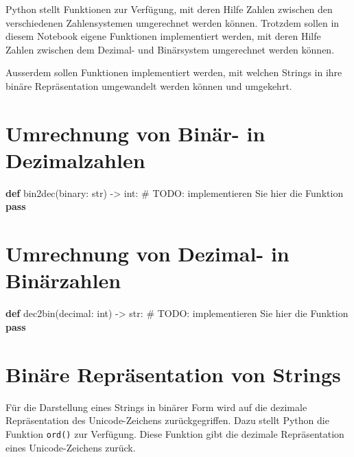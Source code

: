 \documentclass[
  nswissgerman,
  a4paper,
  DIV=11,
  numbers=noendperiod,
  ngerman]{scrreprt}
\newenvironment{Shaded}{\begin{snugshade}}{\end{snugshade}}
\newcommand{\AlertTok}[1]{\textcolor[rgb]{0.68,0.00,0.00}{#1}}
\newcommand{\BuiltInTok}[1]{\textcolor[rgb]{0.00,0.23,0.31}{#1}}
\newcommand{\CommentTok}[1]{\textcolor[rgb]{0.37,0.37,0.37}{#1}}
\newcommand{\ControlFlowTok}[1]{\textcolor[rgb]{0.00,0.23,0.31}{\textbf{#1}}}
\newcommand{\KeywordTok}[1]{\textcolor[rgb]{0.00,0.23,0.31}{\textbf{#1}}}
\newcommand{\NormalTok}[1]{\textcolor[rgb]{0.00,0.23,0.31}{#1}}
\newcommand{\OperatorTok}[1]{\textcolor[rgb]{0.37,0.37,0.37}{#1}}
\begin{document}
Python stellt Funktionen zur Verfügung, mit deren Hilfe Zahlen zwischen
den verschiedenen Zahlensystemen umgerechnet werden können. Trotzdem
sollen in diesem Notebook eigene Funktionen implementiert werden, mit
deren Hilfe Zahlen zwischen dem Dezimal- und Binärsystem umgerechnet
werden können.

Ausserdem sollen Funktionen implementiert werden, mit welchen Strings in
ihre binäre Repräsentation umgewandelt werden können und umgekehrt.

\section{Umrechnung von Binär- in
Dezimalzahlen}\label{umrechnung-von-binuxe4r--in-dezimalzahlen}

\begin{Shaded}
\begin{Highlighting}[numbers=left,,]
\KeywordTok{def}\NormalTok{ bin2dec(binary: }\BuiltInTok{str}\NormalTok{) }\OperatorTok{{-}\textgreater{}} \BuiltInTok{int}\NormalTok{:}
    \CommentTok{\# }\AlertTok{TODO}\CommentTok{: implementieren Sie hier die Funktion}
    \ControlFlowTok{pass}
        
\end{Highlighting}
\end{Shaded}

\section{Umrechnung von Dezimal- in
Binärzahlen}\label{umrechnung-von-dezimal--in-binuxe4rzahlen}

\begin{Shaded}
\begin{Highlighting}[numbers=left,,]
\KeywordTok{def}\NormalTok{ dec2bin(decimal: }\BuiltInTok{int}\NormalTok{) }\OperatorTok{{-}\textgreater{}} \BuiltInTok{str}\NormalTok{:}
    \CommentTok{\# }\AlertTok{TODO}\CommentTok{: implementieren Sie hier die Funktion}
    \ControlFlowTok{pass}
\end{Highlighting}
\end{Shaded}

\section{Binäre Repräsentation von
Strings}\label{binuxe4re-repruxe4sentation-von-strings}

Für die Darstellung eines Strings in binärer Form wird auf die dezimale
Repräsentation des Unicode-Zeichens zurückgegriffen. Dazu stellt Python
die Funktion \texttt{ord()} zur Verfügung. Diese Funktion gibt die
dezimale Repräsentation eines Unicode-Zeichens zurück.
\end{document}
